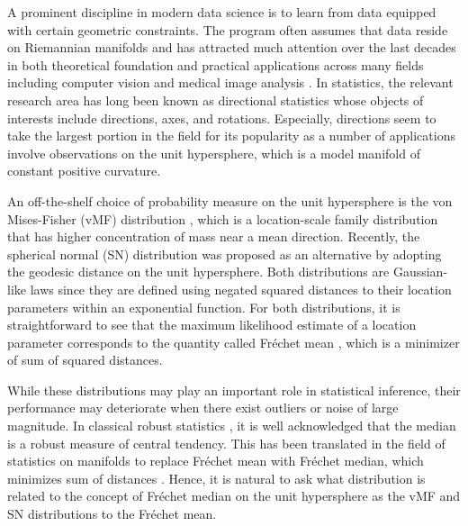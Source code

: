 \documentclass[10pt]{article}
\newcommand{\Frechet}{Fr\'{e}chet }
\begin{document}
A prominent discipline in modern data science is to learn from data equipped with certain geometric constraints. The program often assumes that data reside on Riemannian manifolds \cite{lee_1997_RiemannianManifoldsIntroduction} and has attracted much attention over the last decades in both theoretical foundation \cite{pennec_2006_IntrinsicStatisticsRiemannian, bhattacharya_2012_NonparametricInferenceManifolds, patrangenaru_2016_NonparametricStatisticsManifolds} and practical applications across many fields including  computer vision \cite{bissacco_2001_RecognitionHumanGaits, aggarwal_2004_SystemIdentificationApproach} and medical image analysis  \cite{pennec_2020_RiemannianGeometricStatistics, fletcher_2009_GeometricMedianRiemannian, you_2021_RevisitingRiemannianGeometry}. In statistics, the relevant research area has long been known as directional statistics  \cite{mardia_2000_DirectionalStatistics, ley_2017_ModernDirectionalStatistics} whose objects of interests include directions, axes, and rotations. Especially, directions seem to take the largest portion in the field for its popularity as a number of applications involve observations on the unit hypersphere, which is a model manifold of constant positive curvature. 

An off-the-shelf choice of probability measure on the unit hypersphere is the von Mises-Fisher (vMF) distribution \cite{fisher_1953_DispersionSphere, mardia_2000_DirectionalStatistics}, which is a location-scale family distribution that has higher concentration of mass near a mean direction. Recently, the spherical normal (SN) distribution \cite{hauberg_2018_DirectionalStatisticsSpherical} was proposed as an alternative by adopting the geodesic distance on the unit hypersphere. Both distributions are Gaussian-like laws since they are defined using negated squared distances to their location parameters within an exponential function. For both distributions, it is straightforward to see that the maximum likelihood estimate of a location parameter corresponds to the quantity called \Frechet mean \cite{kendall_1990_ProbabilityConvexityHarmonic}, which is a minimizer of sum of squared distances. 


While these distributions may play an important role in statistical inference, their performance may deteriorate when there exist outliers or noise of large magnitude. In classical robust statistics \cite{huber_1981_RobustStatistics}, it is well acknowledged that the median is a robust measure of central tendency. This has been translated in the field of statistics on manifolds to replace \Frechet mean with \Frechet median, which minimizes sum of distances  \cite{fletcher_2009_GeometricMedianRiemannian, arnaudon_2013_MediansMeansRiemannian}. Hence, it is natural to ask what distribution is related to the concept of \Frechet median on the unit hypersphere as the vMF and SN distributions to the \Frechet mean. 
\end{document}
